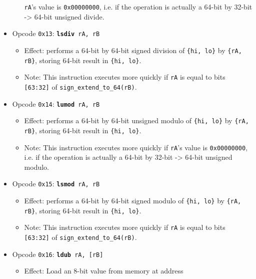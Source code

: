 \documentclass{article}
\begin{document}
\begin{itemize}
\begin{itemize}
		\texttt{rA}'s value is \texttt{0x00000000}, i.e. if the
		operation is actually a 64-bit by 32-bit -> 64-bit unsigned
		divide.
		\end{itemize}
	\item Opcode \texttt{0x13}:
		\texttt{\textbf{lsdiv} rA, rB}
		\begin{itemize}
		\item Effect: performs a 64-bit by 64-bit signed division of
		\texttt{\{hi, lo\}} by \texttt{\{rA, rB\}}, storing 64-bit
		result in \texttt{\{hi, lo\}}.
		\item Note: This instruction executes more quickly if
		\texttt{rA} is equal to bits \texttt{[63:32]} of
		\texttt{sign\_extend\_to\_64(rB)}.
		\end{itemize}
	\item Opcode \texttt{0x14}:
		\texttt{\textbf{lumod} rA, rB}
		\begin{itemize}
		\item Effect: performs a 64-bit by 64-bit unsigned modulo of
		\texttt{\{hi, lo\}} by \texttt{\{rA, rB\}}, storing 64-bit
		result in \texttt{\{hi, lo\}}.
		\item Note: This instruction executes more quickly if
		\texttt{rA}'s value is \texttt{0x00000000}, i.e. if the
		operation is actually a 64-bit by 32-bit -> 64-bit unsigned
		modulo.
		\end{itemize}
	\item Opcode \texttt{0x15}:
		\texttt{\textbf{lsmod} rA, rB}
		\begin{itemize}
		\item Effect: performs a 64-bit by 64-bit signed modulo of
		\texttt{\{hi, lo\}} by \texttt{\{rA, rB\}}, storing 64-bit
		result in \texttt{\{hi, lo\}}.
		\item Note: This instruction executes more quickly if
		\texttt{rA} is equal to bits \texttt{[63:32]} of
		\texttt{sign\_extend\_to\_64(rB)}.
		\end{itemize}
	\item Opcode \texttt{0x16}:
		\texttt{\textbf{ldub} rA, [rB]}
		\begin{itemize}
		\item Effect: Load an 8-bit value from memory at address

\end{itemize}
\end{itemize}
\end{document}
